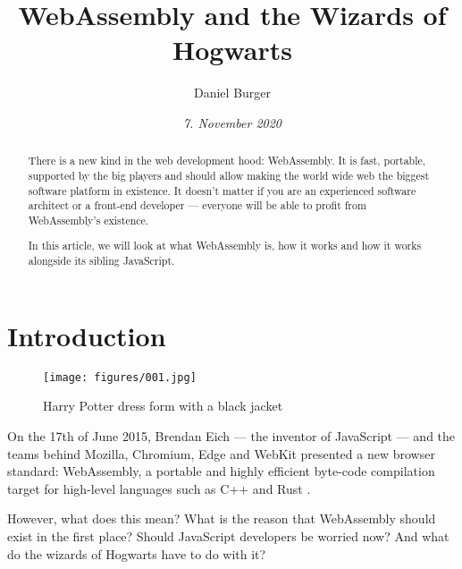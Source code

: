 \documentclass[10pt]{article}
\title{\textbf{WebAssembly and the \linebreak  Wizards of Hogwarts}}
\author{Daniel Burger}
\date{\textit{7. November 2020}}
\renewcommand{\lstlistlistingname}{List of \lstlistingname s}
\begin{document}

\maketitle
\thispagestyle{empty}

\begin{sloppypar} %
  \begin{abstract}
    There is a new kind in the web development hood: WebAssembly. It is fast, portable, supported by the big players and should allow making the world wide web the biggest software platform in existence. It doesn’t matter if you are an experienced software architect or a front-end developer — everyone will be able to profit from WebAssembly’s existence.

    In this article, we will look at what WebAssembly is, how it works and how it works alongside its sibling JavaScript.

  \end{abstract}
  \pagebreak

  \tableofcontents
  \pagebreak

  \listoffigures
  \pagebreak

  \listoftables
  \pagebreak

  \addcontentsline{toc}{section}{\lstlistlistingname}
  \lstlistoflistings
  \pagebreak

  \section{Introduction}
  \label{sec:introduction}

  \begin{figure}[ht]
    \centering
    \texttt{[image: figures/001.jpg]}
    \caption{Harry Potter dress form with a black jacket \citep{unsplash_beautiful_2018}}
    \label{fig:cover}
  \end{figure}

  On the 17th of June 2015, Brendan Eich — the inventor of JavaScript — and the teams behind Mozilla, Chromium, Edge and WebKit presented a new browser standard: WebAssembly, a portable and highly efficient byte-code compilation target for high-level languages such as C++ and Rust \citep{eich_asmjs_2015}.

  However, what does this mean? What is the reason that WebAssembly should exist in the first place? Should JavaScript developers be worried now? And what do the wizards of Hogwarts have to do with it?


\end{sloppypar}
\end{document}
